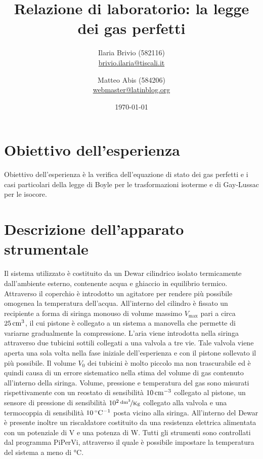\documentclass[italian,a4paper]{article}
\begin{document}
\title{Relazione di laboratorio: la legge dei gas perfetti}
\author{\normalsize Ilaria Brivio (582116)\\%
\normalsize \url{brivio.ilaria@tiscali.it}%
\and %
\normalsize Matteo Abis (584206)\\ %
\normalsize \url{webmaster@latinblog.org}}
\date{\today}
\maketitle
\section{Obiettivo dell'esperienza}
Obiettivo dell'esperienza è la verifica dell'equazione di stato dei gas perfetti e i casi particolari della legge di Boyle per le trasformazioni isoterme e di Gay-Lussac per le isocore.
\section{Descrizione dell'apparato strumentale}
Il sistema utilizzato è costituito da un Dewar cilindrico isolato termicamente dall'ambiente esterno, contenente acqua e ghiaccio in equilibrio termico. Attraverso il coperchio è introdotto un agitatore per rendere più possibile omogenea la temperatura dell'acqua. All'interno del cilindro è fissato un recipiente a forma di siringa monouso di volume massimo $V_{\text{max}}$ pari a circa $\unit[25]{cm^3}$, il cui pistone è collegato a un sistema a manovella che permette di variarne gradualmente la compressione. L'aria viene introdotta nella siringa attraverso due tubicini sottili collegati a una valvola a tre vie. Tale valvola viene aperta una sola volta nella fase iniziale dell'esperienza e con il pistone sollevato il più possibile. Il volume $V_0$ dei tubicini è molto piccolo ma non trascurabile ed è quindi causa di un errore sistematico nella stima del volume di gas contenuto all'interno della siringa. Volume, pressione e temperatura del gas sono misurati rispettivamente con un reostato di sensibilità $\unit[10]{cm^{-3}}$ collegato al pistone, un sensore di pressione di sensibilità $\unitfrac[10^2]{dm^3}{Kg}$ collegato alla valvola e una termocoppia di sensibilità $\unit[10]{\celsius^{-1}}$ posta vicino alla siringa. All'interno del Dewar è presente inoltre un riscaldatore costituito da una resistenza elettrica alimentata con un potenziale di \unit[30]{V} e una potenza di \unit[90]{W}.
Tutti gli strumenti sono controllati dal programma PiPerVi, attraverso il quale è possibile impostare la temperatura del sistema a meno di \unit[1]{\celsius}. 
\end{document}
